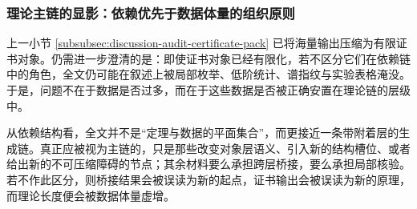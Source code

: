 \subsubsection{理论主链的显影：依赖优先于数据体量的组织原则}\label{subsubsec:discussion-theory-backbone-visibility}
上一小节 \ref{subsubsec:discussion-audit-certificate-pack} 已将海量输出压缩为有限证书对象。仍需进一步澄清的是：即使证书对象已经有限化，若不区分它们在依赖链中的角色，全文仍可能在叙述上被局部枚举、低阶统计、谱指纹与实验表格淹没。于是，问题不在于数据是否过多，而在于这些数据是否被正确安置在理论链的层级中。
\par
从依赖结构看，全文并不是“定理与数据的平面集合”，而更接近一条带附着层的生成链。真正应被视为主链的，只是那些改变对象层语义、引入新的结构槽位、或者给出新的不可压缩障碍的节点；其余材料要么承担跨层桥接，要么承担局部核验。若不作此区分，则桥接结果会被误读为新的起点，证书输出会被误读为新的原理，而理论长度便会被数据体量虚增。
\par
